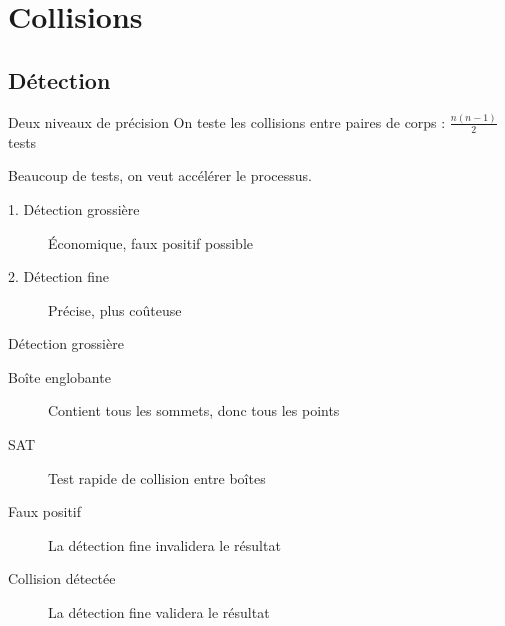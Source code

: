 \documentclass{beamer}
\begin{document}
\section{Collisions}

\subsection{Détection}

\begin{frame}{Deux niveaux de précision}
  On teste les collisions entre paires de corps : $\frac{n(n-1)}{2}$ tests

  \vfill

  Beaucoup de tests, on veut accélérer le processus.

  \vfill

  \begin{description}
  \item[1. Détection grossière] \'Economique, faux positif possible 
  \item[2. Détection fine] Précise, plus coûteuse
  \end{description}
\end{frame}

\begin{frame}{Détection grossière}
  \begin{overprint}

    \begin{figure}
      \centering
      
    \end{figure}
    \begin{description}
    \item[Boîte englobante] Contient tous les sommets, donc tous les points
    \item[SAT] Test rapide de collision entre boîtes
    \end{description}

    \begin{figure}
      \centering
      
    \end{figure}
    \begin{description}
    \item[Faux positif] La détection fine invalidera le résultat
    \end{description}

    \begin{figure}
      \centering
      
    \end{figure}
    \begin{description}
    \item[Collision détectée] La détection fine validera le résultat
    \end{description}

  \end{overprint}
\end{frame}
\end{document}
